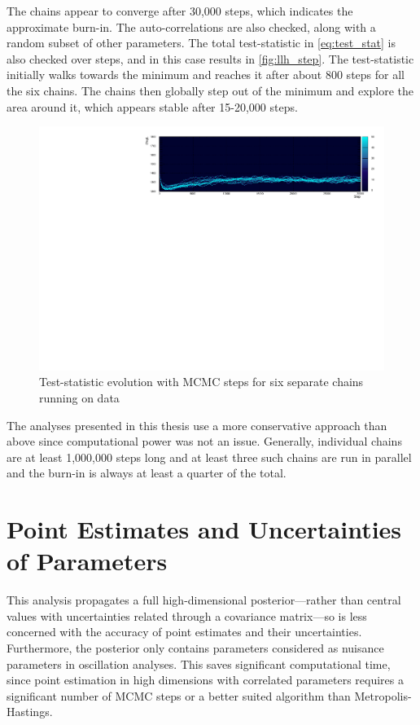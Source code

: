 The chains appear to converge after 30,000 steps, which indicates the approximate burn-in. The auto-correlations are also checked, along with a random subset of other parameters. The total test-statistic in \autoref{eq:test_stat} is also checked over steps, and in this case results in \autoref{fig:llh_step}. The test-statistic initially walks towards the minimum and reaches it after about 800 steps for all the six chains. The chains then globally step out of the minimum and explore the area around it, which appears stable after 15-20,000 steps.
\begin{figure}[h]
	\includegraphics[width=\textwidth, trim={0mm 0mm 0mm 0mm}, clip,page=1]{figures/mcmc/logl_step0}
	\caption{Test-statistic evolution with MCMC steps for six separate chains running on data}
	\label{fig:llh_step}
\end{figure}

The analyses presented in this thesis use a more conservative approach than above since computational power was not an issue. Generally, individual chains are at least 1,000,000 steps long and at least three such chains are run in parallel and the burn-in is always at least a quarter of the total.

\section{Point Estimates and Uncertainties of Parameters}
This analysis propagates a full high-dimensional posterior---rather than central values with uncertainties related through a covariance matrix---so is less concerned with the accuracy of point estimates and their uncertainties. Furthermore, the posterior only contains parameters considered as nuisance parameters in oscillation analyses. This saves significant computational time, since point estimation in high dimensions with correlated parameters requires a significant number of MCMC steps or a better suited algorithm than Metropolis-Hastings.

